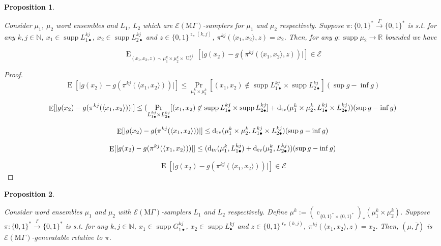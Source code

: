 \documentclass{article}
\numberwithin{equation}{section}
\theoremstyle{definition}
\theoremstyle{plain}
\newtheorem{proposition}{Proposition}[section]
\newcommand{\Bool}{\{0,1\}}
\newcommand{\Words}{{\Bool^*}}
\DeclareMathOperator{\Supp}{supp}
\DeclareMathOperator{\Prb}{Pr}
\DeclareMathOperator{\E}{E}
\DeclareMathOperator{\R}{r}
\DeclareMathOperator{\U}{U}
\DeclareMathOperator{\En}{c}
\newcommand{\Dtv}{\operatorname{d}_{\textnormal{tv}}}
\newcommand{\Nats}{\mathbb{N}}
\newcommand{\Reals}{\mathbb{R}}
\newcommand{\Abs}[1]{\lvert #1 \rvert}
\newcommand{\Chev}[1]{\langle #1 \rangle}
\newcommand{\MGrow}{\mathrm{M}\Gamma}
\newcommand{\Fall}{\mathcal{E}}
\newcommand{\Scheme}{\xrightarrow{\Gamma}}
\begin{document}
\begin{samepage}
\begin{proposition}
\label{prp:tbd}

Consider $\mu_1$, $\mu_2$ word ensembles and $L_1$, $L_2$ which are $\Fall(\MGrow)$-samplers for $\mu_1$ and $\mu_2$ respectively. Suppose $\pi: \Words \Scheme \Words$ is s.t. for any $k,j \in \Nats$, $x_1 \in \Supp L_{1\bullet}^{kj}$, ${x_2 \in \Supp L_{2\bullet}^{kj}}$ and $z \in \Bool^{\R_\pi(k,j)}$, $\pi^{kj}(\Chev{x_1,x_2},z)=x_2$. Then, for any $g: \Supp \mu_2 \rightarrow \Reals$ bounded we have 

$$\E_{(x_1,x_2,z) \sim\mu_1^k \times \mu_2^k \times \U_\pi^{kj}}[\Abs{g(x_2)-g(\pi^{kj}(\Chev{x_1,x_2},z))}] \in \Fall$$

\end{proposition}
\end{samepage}

\begin{proof}

$$\E[\Abs{g(x_2)-g(\pi^{kj}(\Chev{x_1,x_2}))}] \leq \Prb_{ \mu_1^k \times \mu_2^k}[(x_1,x_2) \not\in \Supp L_{1\bullet}^{kj} \times \Supp L_{2\bullet}^{kj}] (\sup g - \inf g)$$

$$\E[\Abs{g(x_2)-g(\pi^{kj}(\Chev{x_1,x_2}))}] \leq (\Prb_{ L_{1\bullet}^{kj} \times L_{2\bullet}^{kj}}[(x_1,x_2) \not\in \Supp L_{1\bullet}^{kj} \times \Supp L_{2\bullet}^{kj}]+\Dtv(\mu_1^k \times \mu_2^k,L_{1\bullet}^{kj} \times L_{2\bullet}^{kj})) (\sup g - \inf g)$$

$$\E[\Abs{g(x_2)-g(\pi^{kj}(\Chev{x_1,x_2}))}] \leq \Dtv(\mu_1^k \times \mu_2^k,L_{1\bullet}^{kj} \times L_{2\bullet}^{kj}) (\sup g - \inf g)$$

$$\E[\Abs{g(x_2)-g(\pi^{kj}(\Chev{x_1,x_2}))}] \leq (\Dtv(\mu_1^k,L_{1\bullet}^{kj})+\Dtv(\mu_2^k,L_{2\bullet}^{kj})) (\sup g - \inf g)$$

$$\E[\Abs{g(x_2)-g(\pi^{kj}(\Chev{x_1,x_2}))}] \in \Fall$$

\end{proof}

\begin{samepage}
\begin{proposition}
\label{prp:tbd}

Consider  word ensembles $\mu_1$ and $\mu_2$ with $\Fall(\MGrow)$-samplers $L_1$ and $L_2$ respectively. Define ${\mu^k:=(\En_{\Words \times \Words})_*(\mu_1^k \times \mu_2^k)}$. Suppose ${\pi: \Words \Scheme \Words}$ is s.t. for any $k,j \in \Nats$, $x_1 \in \Supp G_{1\bullet}^{kj}$, ${x_2 \in \Supp L_\bullet^{kj}}$ and $z \in \Bool^{\R_\pi(k,j)}$, $\pi^{kj}(\Chev{x_1,x_2},z)=x_2$. Then, $(\mu,\bar{f})$ is $\Fall(\MGrow)$-generatable relative to $\pi$.

\end{proposition}
\end{samepage}
\end{document}
